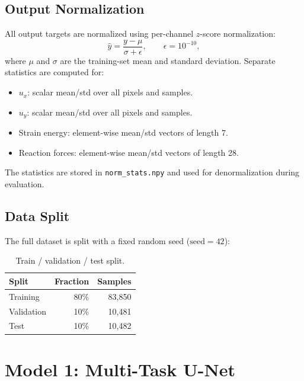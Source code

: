 \documentclass[11pt,a4paper]{article}
\begin{document}
\subsection{Output Normalization}

All output targets are normalized using per-channel $z$-score normalization:
\[
    \hat{y} = \frac{y - \mu}{\sigma + \epsilon}, \qquad \epsilon = 10^{-10},
\]
where $\mu$ and $\sigma$ are the training-set mean and standard deviation.
Separate statistics are computed for:

\begin{itemize}[leftmargin=2em]
    \item $u_x$: scalar mean/std over all pixels and samples.
    \item $u_y$: scalar mean/std over all pixels and samples.
    \item Strain energy: element-wise mean/std vectors of length 7.
    \item Reaction forces: element-wise mean/std vectors of length 28.
\end{itemize}

The statistics are stored in \texttt{norm\_stats.npy} and used for
denormalization during evaluation.

\subsection{Data Split}

The full dataset is split with a fixed random seed ($\text{seed} = 42$):

\begin{table}[H]
\centering
\caption{Train / validation / test split.}
\begin{tabular}{@{}lrr@{}}
\toprule
\textbf{Split} & \textbf{Fraction} & \textbf{Samples} \\
\midrule
Training   & 80\% & 83,850 \\
Validation & 10\% & 10,481 \\
Test       & 10\% & 10,482 \\
\bottomrule
\end{tabular}
\end{table}


\section{Model 1: Multi-Task U-Net}
\label{sec:unet}
\end{document}
